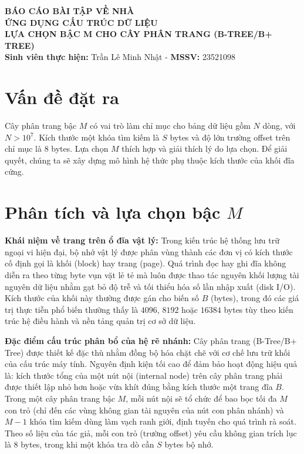 \documentclass[12pt,a4paper]{article}
\begin{document}
\begin{center}
    \LARGE \textbf{BÁO CÁO BÀI TẬP VỀ NHÀ} \\[0.5cm]
    \Large \textbf{ỨNG DỤNG CẤU TRÚC DỮ LIỆU} \\[0.2cm]
    \Large \textbf{LỰA CHỌN BẬC M CHO CÂY PHÂN TRANG (B-TREE/B+ TREE)} \\[0.5cm]
    \normalsize \textbf{Sinh viên thực hiện:} Trần Lê Minh Nhật - \textbf{MSSV:} 23521098
\end{center}
\vspace{1cm}

\section*{Vấn đề đặt ra}
Cây phân trang bậc $M$ có vai trò làm chỉ mục cho bảng dữ liệu gồm $N$ dòng, với $N > 10^7$. Kích thước một khóa tìm kiếm là $S$ bytes và độ lớn trường offset trên chỉ mục là $8$ bytes. Lựa chọn $M$ thích hợp và giải thích lý do lựa chọn. Để giải quyết, chúng ta sẽ xây dựng mô hình hệ thức phụ thuộc kích thước của khối đĩa cứng.

\section*{Phân tích và lựa chọn bậc $M$}

\textbf{Khái niệm về trang trên ổ đĩa vật lý:} 
Trong kiến trúc hệ thống lưu trữ ngoại vi hiện đại, bộ nhớ vật lý được phân vùng thành các đơn vị có kích thước cố định gọi là khối (block) hay trang (page). Quá trình đọc hay ghi đĩa không diễn ra theo từng byte vụn vặt lẻ tẻ mà luôn được thao tác nguyên khối lượng tài nguyên dữ liệu nhằm gạt bỏ độ trễ và tối thiểu hóa số lần nhập xuất (disk I/O). Kích thước của khối này thường được gán cho biến số $B$ (bytes), trong đó các giá trị thực tiễn phổ biến thường thấy là $4096$, $8192$ hoặc $16384$ bytes tùy theo kiến trúc hệ điều hành và nền tảng quản trị cơ sở dữ liệu.

\textbf{Đặc điểm cấu trúc phân bổ của hệ rẽ nhánh:} 
Cây phân trang (B-Tree/B+ Tree) được thiết kế đặc thù nhằm đồng bộ hóa chặt chẽ với cơ chế lưu trữ khối của cấu trúc máy tính. Nguyên định kiện tối cao để đảm bảo hoạt động hiệu quả là: kích thước tổng của một nút nội (internal node) trên cây phân trang phải được thiết lập nhỏ hơn hoặc vừa khít đúng bằng kích thước một trang đĩa $B$. Trong một cây phân trang bậc $M$, mỗi nút nội sẽ tổ chức để bao bọc tối đa $M$ con trỏ (chỉ đến các vùng không gian tài nguyên của nút con phân nhánh) và $M-1$ khóa tìm kiếm dùng làm vạch ranh giới, định tuyến cho quá trình rà soát. Theo số liệu của tác giả, mỗi con trỏ (trường offset) yêu cầu không gian trích lục là $8$ bytes, trong khi một khóa tra dò cần $S$ bytes bộ nhớ. 
\end{document}
